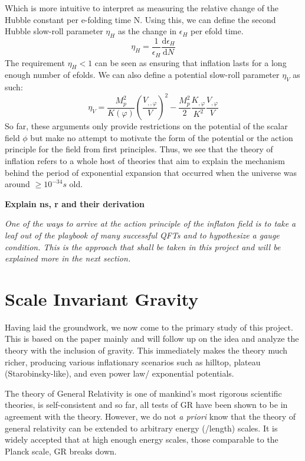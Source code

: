 \documentclass[aps,prd,reprint,preprintnumbers,showpacs,floatfix,nofootinbib,superscript address]{revtex4-2}
\begin{document}
Which is more intuitive to interpret as measuring the relative change of the Hubble constant per e-folding time N. Using this, we can define the second Hubble slow-roll parameter $\eta_H$ as the change in $\epsilon_H$ per efold time.
\begin{equation}
    \eta_H = \frac{1}{\epsilon_H} \frac{\text{d}\epsilon_H}{\text{d}N}
\end{equation}
The requirement $\eta_H < 1$ can be seen as ensuring that inflation lasts for a long enough number of efolds. We can also define a potential slow-roll parameter $\eta_V$ as such:
\begin{equation}
    \eta_V = \frac{M_p^2}{K(\varphi)} \left( \frac{V_{,,\varphi}}{V} \right)^2 - \frac{M_p^2}{2} \frac{K_{,\varphi}}{K^2} \frac{V_{,\varphi}}{V}
\end{equation}
So far, these arguments only provide restrictions on the potential of the scalar field $\phi$ but make no attempt to motivate the form of the potential or the action principle for the field from first principles. Thus, we see that the theory of inflation refers to a whole host of theories that aim to explain the mechanism behind the period of exponential expansion that occurred when the universe was around $\geq 10^{-34}s$ old.

\textbf{Explain ns, r and their derivation}

\textit{One of the ways to arrive at the action principle of the inflaton field is to take a leaf out of the playbook of many successful QFTs and to hypothesize a gauge condition. This is the approach that shall be taken in this project and will be explained more in the next section.}

\section{Scale Invariant Gravity} \label{Scale Invariant Gravity}
Having laid the groundwork, we now come to the primary study of this project. This is based on the paper \cite{barker2024poincaregaugetheoryconformal} mainly and will follow up on the idea and analyze the theory with the inclusion of gravity. This immediately makes the theory much richer, producing various inflationary scenarios such as hilltop, plateau (Starobinsky-like), and even power law/ exponential potentials.

The theory of General Relativity is one of mankind's most rigorous scientific theories, is self-consistent and so far, all tests of GR have been shown to be in agreement with the theory. However, we do not \textit{a priori} know that the theory of general relativity can be extended to arbitrary energy (/length) scales. It is widely accepted that at high enough energy scales, those comparable to the Planck scale, GR breaks down. 
\end{document}
